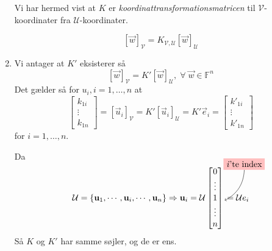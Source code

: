 \begin{bevis}
\begin{enumerate}
			Vi har hermed vist at $K$ er \emph{koordinattransformationsmatricen} til 
			$\mathcal{V}$-koordinater fra $\mathcal{U}$-koordinater.

			\[
				[ \vec{w} ]_\mathcal{V} = K_{\mathcal{V},\mathcal{U}} [ \vec{w}
				]_\mathcal{U}
			\]
		\item Vi antager at $K'$ eksisterer så
			\[
				[\vec{w}]_\mathcal{V} = K'[\vec{w}]_\mathcal{U}, \;\forall\; \vec{w} \in
				\mathbb{F}^n
			\]
			Det gælder så for $u_i, i = 1, \ldots, n$ at
			\[
				\begin{bmatrix}
					k_{1i}\\
					\vdots\\
					k_{1n}
				\end{bmatrix}
				=
				[\vec{u}_i]_\mathcal{V} = K'[\vec{u}_i]_\mathcal{U} = K'\vec{e}_i =
				\begin{bmatrix}
					k'_{1i}\\
					\vdots\\
					k'_{1n}
				\end{bmatrix}
			\]
			for $i = 1, \ldots, n$.

			Da 
			$$
			\mathcal{U} = \{\vec{u}_1, \cdots, \vec{u}_i, \cdots, \vec{u}_n\}
			\Ra \vec{u}_i = \mathcal{U}
			\begin{bmatrix}
				0\\
				\vdots\\
				1 \tikz[baseline=-.5ex] \node[coordinate] (ith){};\\
				\vdots\\
				n
			\end{bmatrix}
			\tikz[overlay]{
				\node[fill=red!25] (ith1) at (0.8,1.5) {\textit{i}'te index};
				\path[->] (ith1) edge [bend left] (ith);
			}
			= \mathcal{U}e_i
			$$
			Så $K$ og $K'$ har samme søjler, og de er ens.
	\end{enumerate}
\end{bevis}
